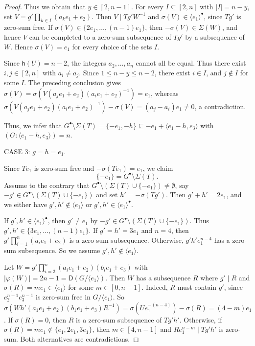 \documentclass[a4paper, 10pt]{amsart}
\theoremstyle{plain}
\theoremstyle{definition}
\numberwithin{equation}{section}
\begin{document}
{\begin{proof}
Thus we obtain that $y\in[2,n-1]$. For every $I\subseteq[2,n]$ with $|I|=n-y$, set $V=g'\prod_{k\in I}(a_ke_1+e_2)$. Then $V\mid Tg'W^{-1}$ and $\sigma(V)\in\langle e_1\rangle^\bullet$, since $Tg'$ is zero-sum free. If $\sigma(V)\in\{2e_1,\ldots,(n-1)e_1\}$, then $-\sigma(V)\in\Sigma(W)$, and hence $V$ can be completed to a zero-sum subsequence of $Tg'$ by a subsequence of $W$. Hence $\sigma(V)=e_1$ for every choice of the sets $I$. 
		
	Since $\mathsf h(U)=n-2$, the integers $a_2,\ldots,a_n$ cannot all be equal. Thus there exist $i,j\in[2,n]$ with $a_i\ne a_j$. Since $1\le n-y\le n-2$, there exist $i\in I$, and $j\notin I$ for some $I$. The preceding conclusion gives $\sigma(V)=\sigma(V(a_je_1+e_2)(a_ie_1+e_2)^{-1})=e_1$, whereas $\sigma(V(a_je_1+e_2)(a_ie_1+e_2)^{-1})-\sigma(V)=(a_j-a_i)e_1\ne0$, a contradiction.

	Thus, we infer that $G^{\bullet}\setminus \Sigma (T)=\{-e_1,-h \}\subseteq -e_1+ \langle e_1-h, e_3\rangle$ with $(G:\langle e_1-h, e_3 \rangle)=n$.
	
	\smallskip
	\noindent
	CASE 3:  $g=h=e_1$.
	
	Since $Te_1$ is zero-sum free and $-\sigma(Te_1)=e_1$, we claim
	\[
	\{-e_1\}= G^{\bullet}\setminus \Sigma (T).
	\]
	Assume to the contrary that $G^{\bullet}\setminus \left(\Sigma (T) \cup \{ -e_1\}\right)\ne \emptyset$, say $-g'\in G^{\bullet}\setminus \left(\Sigma (T) \cup \{ -e_1\}\right)$ and set $h' = - \sigma (Tg')$.  Then $g'+h' =2e_1$, and we either have $g', h' \notin \langle e_1 \rangle$ or $g', h' \in \langle e_1 \rangle^{\bullet}$. 
	
	If $g', h' \in \langle e_1 \rangle^{\bullet}$, then $g'\ne e_1$ by $-g'\in G^{\bullet}\setminus \left(\Sigma (T) \cup \{ -e_1\}\right)$.  Thus $g', h' \in \{3e_1, \ldots, (n-1)e_1 \}$. If $g'=h'=3e_1$ and $n=4$, then $g'\prod_{i=1}^n (a_ie_1+e_2)$ is a zero-sum subsequence. Otherwise, $g' h'e_1^{n-4}$ has a zero-sum subsequence. So we assume $g', h' \notin \langle e_1 \rangle$.
	
	Let $W=g'\prod_{i=2}^n (a_ie_1+e_2)(b_ie_1+e_3)$ with $|\varphi(W)|= 2n-1= \mathsf{D}(G/\langle e_1 \rangle)$. Then $W$ has a subsequence $R$ 
	where $g'\mid R$ and $\sigma(R)=me_1\in \langle e_1 \rangle$ for some $m\in[0,n-1]$. Indeed, $R$ must contain $g'$, since $e_2^{n-1}e_3^{n-1}$ is zero-sum free in $G/\langle e_1\rangle$. So $\sigma(Wh'(a_1e_1+e_2)
	(b_1e_1+e_3)R^{-1})=\sigma(Ue_1^{-(n-4)})- \sigma(R)=(4-m)e_1$. If $\sigma(R)=0$, then $R$ is a zero-sum subsequence of $Tg'h'$. Otherwise, if $\sigma(R)=me_1\notin\{e_1,2e_1,3e_1\}$, then $m\in[4,n-1]$ and $Re_1^{n-m}\mid Tg'h'$ is zero-sum. Both alternatives are contradictions.
	

\end{proof}}
\end{document}
